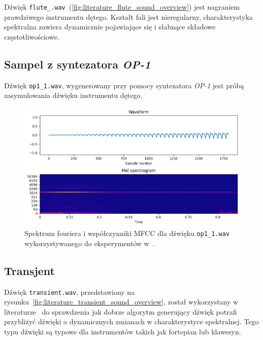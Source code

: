 Dźwięk \texttt{flute\_.wav}~(\ref{fig:literature_flute_sound_overview})
jest nagraniem prawdziwego instrumentu dętego. Kształt fali jest nieregularny,
charakterystyka spektralna zawiera dynamicznie pojawiające się i słabnące 
składowe częstotliwościowe.

\subsection{Sampel z syntezatora \textit{OP-1}}

Dźwięk \texttt{op1\_1.wav}, wygenerowany przy pomocy syntezatora \textit{OP-1} jest próbą
zasymulowania dźwięku instrumentu dętego.

\begin{figure}[H]
    \centering
    \includegraphics[width=0.7\linewidth]{rys06/target_sample_op1_literature.png}
    \caption{
      Spektrum fouriera i współczynniki MFCC dla dźwięku \texttt{op1\_1.wav} wykorzystywanego
      do eksperymentów w~\cite{evolutionary_puredata_results}.
    }\label{fig:literature_op_1_sound_overview}
\end{figure}

\subsection{Transjent}

Dźwięk \texttt{transient.wav}, przedstawiony na rysunku~\ref{fig:literature_transient_sound_overview},
został wykorzystany w literaturze~\cite{evolutionary_puredata} do sprawdzenia jak dobrze algorytm
generujący dźwięk potrafi przybliżyć dźwięki o dynamicznych zmianach w charakterystyce spektralnej.
Tego typu dźwięki są typowe dla instrumentów takich jak fortepian lub klawesyn.

